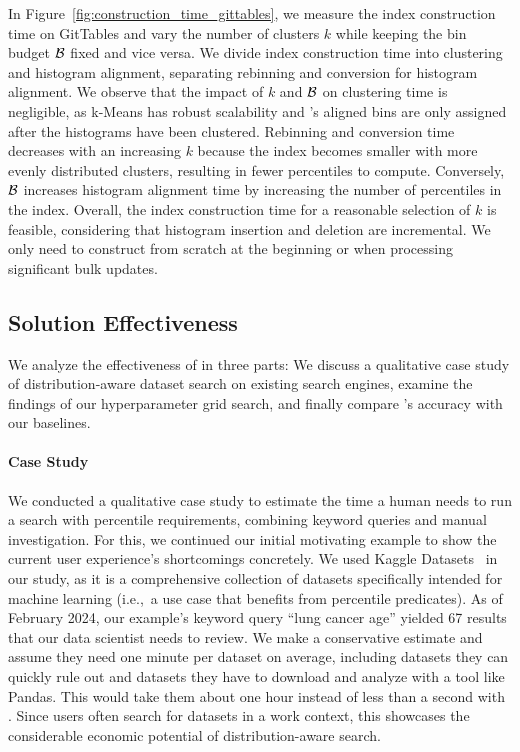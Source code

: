 In Figure~\ref{fig:construction_time_gittables}, we measure the index construction time on GitTables and vary the number of clusters $k$ while keeping the bin budget $\mathcal{B}$ fixed and vice versa.
We divide index construction time into clustering and histogram alignment, separating rebinning and conversion for histogram alignment.
We observe that the impact of $k$ and $\mathcal{B}$ on clustering time is negligible, as k-Means has robust scalability and \system{}'s aligned bins are only assigned after the histograms have been clustered.
Rebinning and conversion time decreases with an increasing $k$ because the index becomes smaller with more evenly distributed clusters, resulting in fewer percentiles to compute.
Conversely, $\mathcal{B}$ increases histogram alignment time by increasing the number of percentiles in the index.
Overall, the index construction time for a reasonable selection of $k$ is feasible, considering that histogram insertion and deletion are incremental.
We only need to construct \system{} from scratch at the beginning or when processing significant bulk updates.


\subsection{Solution Effectiveness}
\label{sec:solution_effectiveness}

We analyze the effectiveness of \system{} in three parts:
We discuss a qualitative case study of distribution-aware dataset search on existing search engines, examine the findings of our hyperparameter grid search, and finally compare \system{}'s accuracy with our baselines.

\paragraph{Case Study}
We conducted a qualitative case study to estimate the time a human needs to run a search with percentile requirements, combining keyword queries and manual investigation.
For this, we continued our initial motivating example to show the current user experience's shortcomings concretely.
We used Kaggle Datasets~\cite{kaggle_inc_kaggle_2024} in our study, as it is a comprehensive collection of datasets specifically intended for machine learning (i.e.,~a use case that benefits from percentile predicates).
As of February 2024, our example's keyword query ``lung cancer age'' yielded 67 results that our data scientist needs to review.
We make a conservative estimate and assume they need one minute per dataset on average, including datasets they can quickly rule out and datasets they have to download and analyze with a tool like Pandas.
This would take them about one hour instead of less than a second with \system{}.
Since users often search for datasets in a work context, this showcases the considerable economic potential of distribution-aware search.

